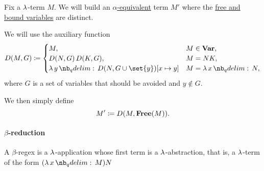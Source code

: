 \begin{algorithm}\label{alg:alpha_equivalent_term_with_distinct_variables}
  Fix a \( \mathrm{\lambda} \)-term \( M \). We will build an \hyperref[def:untyped_lambda_term_alpha_equivalence]{\( \alpha \)-equivalent} term \( M' \) where the \hyperref[def:lambda_variable_freeness]{free and bound variables} are distinct.

  We will use the auxiliary function
  \begin{equation*}
    D(M, G) \coloneqq \begin{cases}
      M,                                          &M \in \op*{Var}, \\
      D(N, G) \thinspace D(K, G),                 &M = NK, \\
      \qabs y D(N, G \cup \set{ y })[x \mapsto y] &M = \qabs x N,
    \end{cases}
  \end{equation*}
  where \( G \) is a set of variables that should be avoided and \( y \not\in G \).

  We then simply define
  \begin{equation*}
    M' \coloneqq D(M, \op*{Free}(M)).
  \end{equation*}
\end{algorithm}

\paragraph{\( \beta \)-reduction}

\begin{definition}\label{def:beta_redex}
  A \( \beta \)-regex is a \( \mathrm{\lambda} \)-application whose first term is a \( \mathrm{\lambda} \)-abstraction, that is, a \( \mathrm{\lambda} \)-term of the form \( (\qabs x M) N \)
\end{definition}
